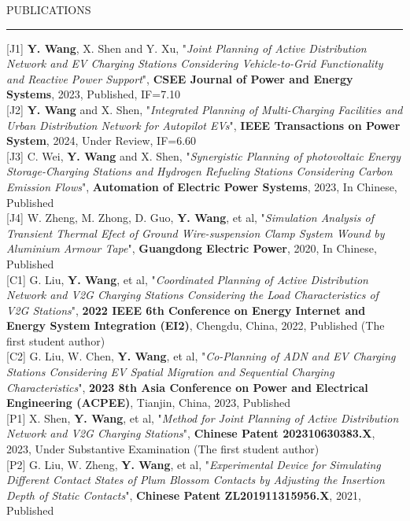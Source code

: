 \documentclass{resume} %
\renewenvironment{rSection}[1]{
\sectionskip
\textcolor{TsinghuaPurple}{\MakeUppercase{#1}}
\sectionlineskip
\hrule
\begin{list}{}{
\setlength{\leftmargin}{0em}
}
\item[]
}{
\end{list}
}
\begin{document}
\iffalse
\begin{rSection}{ Publications } \itemsep -3pt        

{[J1] \textbf{Y. Wang}, X. Shen and Y. Xu, "\textit{Joint Planning of Active Distribution Network and EV Charging Stations Considering Vehicle-to-Grid Functionality and Reactive Power Support}", \textbf{CSEE Journal of Power and Energy Systems}}, 2023, Published, IF=7.10\\
{[J2] \textbf{Y. Wang} and X. Shen, "\textit{Integrated Planning of Multi-Charging Facilities and Urban Distribution Network for Autopilot EVs}", \textbf{IEEE Transactions on Power System}}, 2024, Under Review, IF=6.60\\
{[J3] C. Wei, \textbf{Y. Wang} and X. Shen, "\textit{Synergistic Planning of photovoltaic Energy Storage-Charging Stations and Hydrogen Refueling Stations Considering Carbon Emission Flows}", \textbf{Automation of Electric Power Systems}}, 2023, In Chinese, Published \\    
{[J4] W. Zheng, M. Zhong, D. Guo, \textbf{Y. Wang}, et al, "\textit{Simulation Analysis of Transient Thermal Efect of Ground Wire-suspension Clamp System Wound by Aluminium Armour Tape}", \textbf{Guangdong Electric Power}}, 2020, In Chinese, Published\\
{[C1] G. Liu, \textbf{Y. Wang}, et al, "\textit{Coordinated Planning of Active Distribution Network and V2G Charging Stations Considering the Load Characteristics of V2G Stations}", \textbf{2022 IEEE 6th Conference on Energy Internet and Energy System Integration (EI2)}}, Chengdu, China, 2022, Published (The first student author)\\
{[C2] G. Liu, W. Chen, \textbf{Y. Wang}, et al, "\textit{Co-Planning of ADN and EV Charging Stations Considering EV Spatial Migration and Sequential Charging Characteristics}", \textbf{2023 8th Asia Conference on Power and Electrical Engineering (ACPEE)}}, Tianjin, China, 2023, Published\\
{[P1] X. Shen, \textbf{Y. Wang}, et al, "\textit{Method for Joint Planning of Active Distribution Network and V2G Charging Stations}", \textbf{Chinese Patent 202310630383.X}}, 2023, Under Substantive Examination (The first student author)\\
{[P2] G. Liu, W. Zheng, \textbf{Y. Wang}, et al, "\textit{Experimental Device for Simulating Different Contact States of Plum Blossom Contacts by Adjusting the Insertion Depth of Static Contacts}", \textbf{Chinese Patent ZL201911315956.X}}, 2021, Published\\

\end{rSection}
\end{document}
